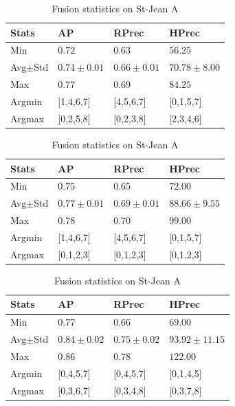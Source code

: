 \begin{table}
  \centering
  \caption{Fusion statistics on St-Jean A}
  \label{tab:fusion_stats_A}

  \begin{tabular}{l l l l}
    \toprule
    Stats
    & AP
    & RPrec
    & HPrec \\
    \midrule
    Min & $0.72$ & $0.63$ & $56.25$ \\
    Avg$\pm$Std & $0.74\pm0.01$ & $0.66\pm0.01$ & $70.78\pm8.00$ \\
    Max & $0.77$ & $0.69$ & $84.25$ \\
    Argmin & [1,4,6,7] & [4,5,6,7] & [0,1,5,7] \\
    Argmax & [0,2,5,8] & [0,2,3,8] & [2,3,4,6] \\
    \bottomrule
  \end{tabular}

  \vspace{0.5cm}

  \begin{tabular}{l l l l}
    \toprule
    Stats
    & AP
    & RPrec
    & HPrec \\
    \midrule
    Min & $0.75$ & $0.65$ & $72.00$ \\
    Avg$\pm$Std & $0.77\pm0.01$ & $0.69\pm0.01$ & $88.66\pm9.55$ \\
    Max & $0.78$ & $0.70$ & $99.00$ \\
    Argmin & [1,4,6,7] & [4,5,6,7] & [0,1,5,7] \\
    Argmax & [0,1,2,3] & [0,1,2,3] & [0,1,2,3] \\
    \bottomrule
  \end{tabular}

  \vspace{0.5cm}

  \begin{tabular}{l l l l}
    \toprule
    Stats
    & AP
    & RPrec
    & HPrec \\
    \midrule
    Min & $0.77$ & $0.66$ & $69.00$ \\
    Avg$\pm$Std & $0.84\pm0.02$ & $0.75\pm0.02$ & $93.92\pm11.15$ \\
    Max & $0.86$ & $0.78$ & $122.00$ \\
    Argmin & [0,4,5,7] & [0,4,5,7] & [0,1,4,5] \\
    Argmax & [0,3,6,7] & [0,3,4,8] & [0,3,7,8] \\
    \bottomrule
  \end{tabular}


\end{table}
